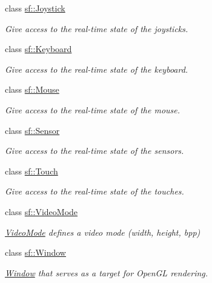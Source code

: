 \begin{DoxyCompactItemize}
class \mbox{\hyperlink{classsf_1_1_joystick}{sf\+::\+Joystick}}
\begin{DoxyCompactList}\small\item\em Give access to the real-\/time state of the joysticks. \end{DoxyCompactList}\item 
class \mbox{\hyperlink{classsf_1_1_keyboard}{sf\+::\+Keyboard}}
\begin{DoxyCompactList}\small\item\em Give access to the real-\/time state of the keyboard. \end{DoxyCompactList}\item 
class \mbox{\hyperlink{classsf_1_1_mouse}{sf\+::\+Mouse}}
\begin{DoxyCompactList}\small\item\em Give access to the real-\/time state of the mouse. \end{DoxyCompactList}\item 
class \mbox{\hyperlink{classsf_1_1_sensor}{sf\+::\+Sensor}}
\begin{DoxyCompactList}\small\item\em Give access to the real-\/time state of the sensors. \end{DoxyCompactList}\item 
class \mbox{\hyperlink{classsf_1_1_touch}{sf\+::\+Touch}}
\begin{DoxyCompactList}\small\item\em Give access to the real-\/time state of the touches. \end{DoxyCompactList}\item 
class \mbox{\hyperlink{classsf_1_1_video_mode}{sf\+::\+Video\+Mode}}
\begin{DoxyCompactList}\small\item\em \mbox{\hyperlink{classsf_1_1_video_mode}{Video\+Mode}} defines a video mode (width, height, bpp) \end{DoxyCompactList}\item 
class \mbox{\hyperlink{classsf_1_1_window}{sf\+::\+Window}}
\begin{DoxyCompactList}\small\item\em \mbox{\hyperlink{classsf_1_1_window}{Window}} that serves as a target for Open\+GL rendering. \end{DoxyCompactList}\end{DoxyCompactItemize}
